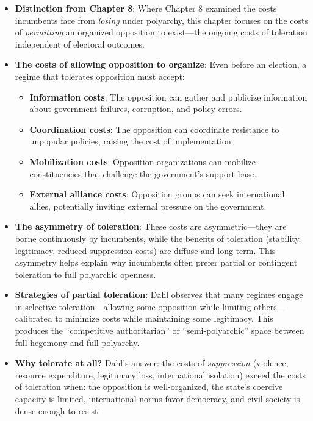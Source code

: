 \documentclass[12pt]{article}
\begin{document}
\begin{itemize}[leftmargin=*, itemsep=4pt]
    \item \textbf{Distinction from Chapter 8}: Where Chapter 8 examined the costs incumbents face from \emph{losing} under polyarchy, this chapter focuses on the costs of \emph{permitting} an organized opposition to exist---the ongoing costs of toleration independent of electoral outcomes.
    \item \textbf{The costs of allowing opposition to organize}: Even before an election, a regime that tolerates opposition must accept:
        \begin{itemize}
            \item \textbf{Information costs}: The opposition can gather and publicize information about government failures, corruption, and policy errors.
            \item \textbf{Coordination costs}: The opposition can coordinate resistance to unpopular policies, raising the cost of implementation.
            \item \textbf{Mobilization costs}: Opposition organizations can mobilize constituencies that challenge the government's support base.
            \item \textbf{External alliance costs}: Opposition groups can seek international allies, potentially inviting external pressure on the government.
        \end{itemize}
    \item \textbf{The asymmetry of toleration}: These costs are asymmetric---they are borne continuously by incumbents, while the benefits of toleration (stability, legitimacy, reduced suppression costs) are diffuse and long-term. This asymmetry helps explain why incumbents often prefer partial or contingent toleration to full polyarchic openness.
    \item \textbf{Strategies of partial toleration}: Dahl observes that many regimes engage in selective toleration---allowing some opposition while limiting others---calibrated to minimize costs while maintaining some legitimacy. This produces the ``competitive authoritarian'' or ``semi-polyarchic'' space between full hegemony and full polyarchy.
    \item \textbf{Why tolerate at all?} Dahl's answer: the costs of \emph{suppression} (violence, resource expenditure, legitimacy loss, international isolation) exceed the costs of toleration when: the opposition is well-organized, the state's coercive capacity is limited, international norms favor democracy, and civil society is dense enough to resist.

\end{itemize}
\end{document}
